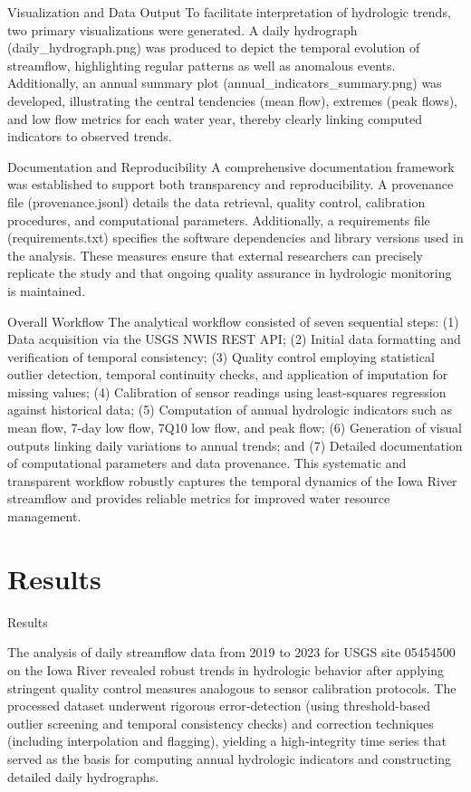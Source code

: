 \documentclass[preprint,12pt]{elsarticle}
\begin{document}
Visualization and Data Output
To facilitate interpretation of hydrologic trends, two primary visualizations were generated. A daily hydrograph (daily\_hydrograph.png) was produced to depict the temporal evolution of streamflow, highlighting regular patterns as well as anomalous events. Additionally, an annual summary plot (annual\_indicators\_summary.png) was developed, illustrating the central tendencies (mean flow), extremes (peak flows), and low flow metrics for each water year, thereby clearly linking computed indicators to observed trends.

Documentation and Reproducibility
A comprehensive documentation framework was established to support both transparency and reproducibility. A provenance file (provenance.jsonl) details the data retrieval, quality control, calibration procedures, and computational parameters. Additionally, a requirements file (requirements.txt) specifies the software dependencies and library versions used in the analysis. These measures ensure that external researchers can precisely replicate the study and that ongoing quality assurance in hydrologic monitoring is maintained.

Overall Workflow
The analytical workflow consisted of seven sequential steps: (1) Data acquisition via the USGS NWIS REST API; (2) Initial data formatting and verification of temporal consistency; (3) Quality control employing statistical outlier detection, temporal continuity checks, and application of imputation for missing values; (4) Calibration of sensor readings using least-squares regression against historical data; (5) Computation of annual hydrologic indicators such as mean flow, 7-day low flow, 7Q10 low flow, and peak flow; (6) Generation of visual outputs linking daily variations to annual trends; and (7) Detailed documentation of computational parameters and data provenance. This systematic and transparent workflow robustly captures the temporal dynamics of the Iowa River streamflow and provides reliable metrics for improved water resource management.


\section{Results}

Results

The analysis of daily streamflow data from 2019 to 2023 for USGS site 05454500 on the Iowa River revealed robust trends in hydrologic behavior after applying stringent quality control measures analogous to sensor calibration protocols. The processed dataset underwent rigorous error‐detection (using threshold-based outlier screening and temporal consistency checks) and correction techniques (including interpolation and flagging), yielding a high‐integrity time series that served as the basis for computing annual hydrologic indicators and constructing detailed daily hydrographs.
\end{document}
